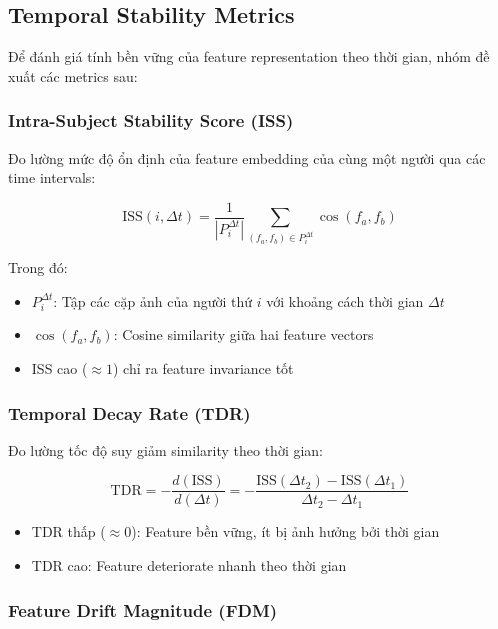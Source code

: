 \subsection{Temporal Stability Metrics}

Để đánh giá tính bền vững của feature representation theo thời gian, nhóm đề xuất các metrics sau:

\subsubsection{Intra-Subject Stability Score (ISS)}

Đo lường mức độ ổn định của feature embedding của cùng một người qua các time intervals:

\begin{equation}
\text{ISS}(i, \Delta t) = \frac{1}{|P_i^{\Delta t}|} \sum_{(f_a, f_b) \in P_i^{\Delta t}} \cos(f_a, f_b)
\end{equation}

Trong đó:
\begin{itemize}
    \item $P_i^{\Delta t}$: Tập các cặp ảnh của người thứ $i$ với khoảng cách thời gian $\Delta t$
    \item $\cos(f_a, f_b)$: Cosine similarity giữa hai feature vectors
    \item ISS cao ($\approx 1$) chỉ ra feature invariance tốt
\end{itemize}

\subsubsection{Temporal Decay Rate (TDR)}

Đo lường tốc độ suy giảm similarity theo thời gian:

\begin{equation}
\text{TDR} = -\frac{d(\text{ISS})}{d(\Delta t)} = -\frac{\text{ISS}(\Delta t_2) - \text{ISS}(\Delta t_1)}{\Delta t_2 - \Delta t_1}
\end{equation}

\begin{itemize}
    \item TDR thấp ($\approx 0$): Feature bền vững, ít bị ảnh hưởng bởi thời gian
    \item TDR cao: Feature deteriorate nhanh theo thời gian
\end{itemize}

\subsubsection{Feature Drift Magnitude (FDM)}

